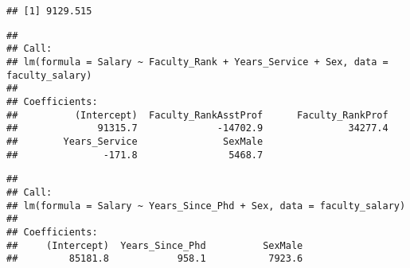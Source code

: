 \documentclass[]{article}
\begin{document}
\begin{verbatim}
## [1] 9129.515
\end{verbatim}

\begin{verbatim}
## 
## Call:
## lm(formula = Salary ~ Faculty_Rank + Years_Service + Sex, data = faculty_salary)
## 
## Coefficients:
##          (Intercept)  Faculty_RankAsstProf      Faculty_RankProf  
##              91315.7              -14702.9               34277.4  
##        Years_Service               SexMale  
##               -171.8                5468.7
\end{verbatim}

\begin{verbatim}
## 
## Call:
## lm(formula = Salary ~ Years_Since_Phd + Sex, data = faculty_salary)
## 
## Coefficients:
##     (Intercept)  Years_Since_Phd          SexMale  
##         85181.8            958.1           7923.6
\end{verbatim}
\end{document}

